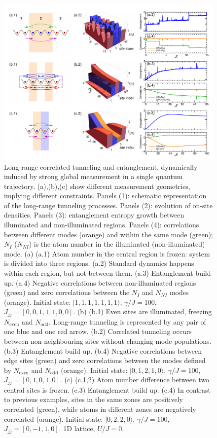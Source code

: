 \begin{figure}[hbtp!]
  \includegraphics[width=\textwidth]{Zeno.pdf}
  \caption[Emergent Long-Range Correlated Tunnelling]{ Long-range
    correlated tunneling and entanglement, dynamically induced by
    strong global measurement in a single quantum
    trajectory. (a),(b),(c) show different measurement geometries,
    implying different constraints. Panels (1): schematic
    representation of the long-range tunneling processes. Panels (2):
    evolution of on-site densities. Panels (3): entanglement entropy
    growth between illuminated and non-illuminated regions. Panels
    (4): correlations between different modes (orange) and within the
    same mode (green); $N_I$ ($N_{NI}$) is the atom number in the
    illuminated (non-illuminated) mode.  (a) (a.1) Atom number in the
    central region is frozen: system is divided into three
    regions. (a.2) Standard dynamics happens within each region, but
    not between them. (a.3) Entanglement build up. (a.4) Negative
    correlations between non-illuminated regions (green) and zero
    correlations between the $N_I$ and $N_{NI}$ modes
    (orange). Initial state: $|1,1,1,1,1,1,1 \rangle$, $\gamma/J=100$,
    $J_{jj}=[0,0,1,1,1,0,0]$.  (b) (b.1) Even sites are illuminated,
    freezing $N_\text{even}$ and $N_\text{odd}$. Long-range tunneling
    is represented by any pair of one blue and one red arrow. (b.2)
    Correlated tunneling occurs between non-neighbouring sites without
    changing mode populations. (b.3) Entanglement build up. (b.4)
    Negative correlations between edge sites (green) and zero
    correlations between the modes defined by $N_\text{even}$ and
    $N_\text{odd}$ (orange). Initial state: $|0,1,2,1,0 \rangle$,
    $\gamma/J=100$, $J_{jj}=[0,1,0,1,0]$.  (c) (c.1,2) Atom number
    difference between two central sites is frozen. (c.3) Entanglement
    build up. (c.4) In contrast to previous examples, sites in the
    same zones are positively correlated (green), while atoms in
    different zones are negatively correlated (orange). Initial state:
    $|0,2,2,0 \rangle$, $\gamma/J=100$, $J_{jj}=[0,-1,1,0]$. 1D
    lattice, $U/J=0$.}
  \label{fig:zeno}
\end{figure}

